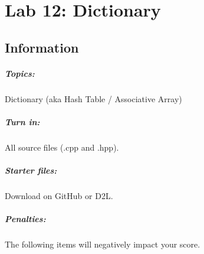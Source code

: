 \documentclass[a4paper,12pt,oneside]{book}
\title{}
\author{Rachel Morris}
\date{\today}
\newcommand{\laLab}{Lab 12: Dictionary\ }
\begin{document}
    \chapter*{\laLab} 

        \section{Information}
            \paragraph{ Topics: } Dictionary (aka Hash Table / Associative Array)
            \paragraph{ Turn in: } All source files (.cpp and .hpp).
            \paragraph{ Starter files: } Download on GitHub or D2L.
        
            \paragraph{ Penalties: }
                The following items will negatively impact your score.
\end{document}
